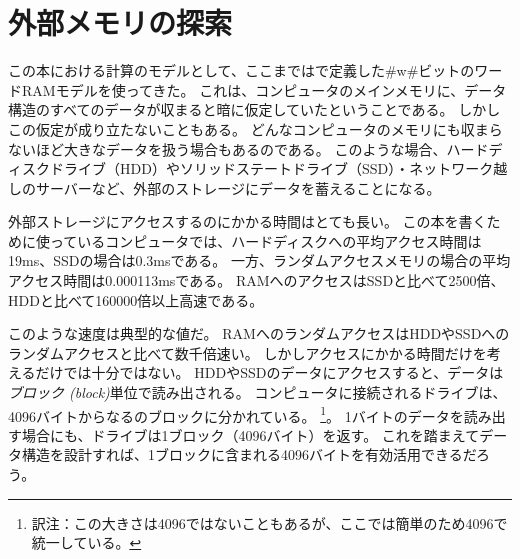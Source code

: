 \chapter{外部メモリの探索}
この本における計算のモデルとして、ここまではで定義した#w#ビットのワードRAMモデルを使ってきた。
これは、コンピュータのメインメモリに、データ構造のすべてのデータが収まると暗に仮定していたということである。
しかしこの仮定が成り立たないこともある。
どんなコンピュータのメモリにも収まらないほど大きなデータを扱う場合もあるのである。
このような場合、ハードディスクドライブ（HDD）やソリッドステートドライブ（SSD）・ネットワーク越しのサーバーなど、外部のストレージにデータを蓄えることになる。

%
%
%
%
外部ストレージにアクセスするのにかかる時間はとても長い。
この本を書くために使っているコンピュータでは、ハードディスクへの平均アクセス時間は19ms、SSDの場合は0.3msである。
一方、ランダムアクセスメモリの場合の平均アクセス時間は0.000113msである。
RAMへのアクセスはSSDと比べて2500倍、HDDと比べて160000倍以上高速である。

% 
% 

このような速度は典型的な値だ。
RAMへのランダムアクセスはHDDやSSDへのランダムアクセスと比べて数千倍速い。
しかしアクセスにかかる時間だけを考えるだけでは十分ではない。
HDDやSSDのデータにアクセスすると、データは
\emph{ブロック (block)}単位で読み出される。
%
コンピュータに接続されるドライブは、4096バイトからなるのブロックに分かれている。
\footnote{訳注：この大きさは4096ではないこともあるが、ここでは簡単のため4096で統一している。}。
1バイトのデータを読み出す場合にも、ドライブは1ブロック（4096バイト）を返す。
これを踏まえてデータ構造を設計すれば、1ブロックに含まれる4096バイトを有効活用できるだろう。

